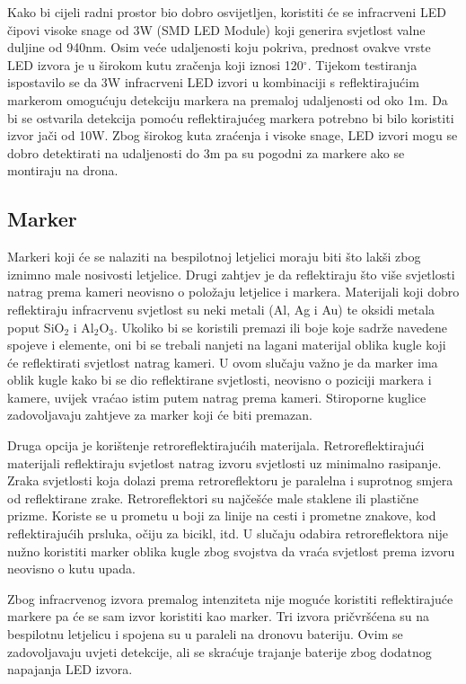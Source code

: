 \documentclass[times, utf8, diplomski]{fer}
\begin{document}
Kako bi cijeli radni prostor bio dobro osvijetljen, koristiti će se infracrveni LED čipovi visoke snage od 3W (SMD LED Module) koji generira svjetlost valne duljine od 940nm. Osim veće udaljenosti koju pokriva, prednost ovakve vrste LED izvora je u širokom kutu zračenja koji iznosi 120$^{\circ}$. Tijekom testiranja ispostavilo se da 3W infracrveni LED izvori u kombinaciji s reflektirajućim markerom omogućuju detekciju markera na premaloj udaljenosti od oko 1m. Da bi se ostvarila detekcija pomoću reflektirajućeg markera potrebno bi bilo koristiti izvor jači od 10W. Zbog širokog kuta zraćenja i visoke snage, LED izvori mogu se dobro detektirati na udaljenosti do 3m pa su pogodni za markere ako se montiraju na drona.

\subsection{Marker}
Markeri koji će se nalaziti na bespilotnoj letjelici moraju biti što lakši zbog iznimno male nosivosti letjelice. Drugi zahtjev je da reflektiraju što više svjetlosti natrag prema kameri neovisno o položaju letjelice i markera. Materijali koji dobro reflektiraju infracrvenu svjetlost su neki metali (Al, Ag i Au) te oksidi metala poput SiO$_2$ i Al$_2$O$_3$. Ukoliko bi se koristili premazi ili boje koje sadrže navedene spojeve i elemente, oni bi se trebali nanjeti na lagani materijal oblika kugle koji će reflektirati svjetlost natrag kameri. U ovom slučaju važno je da marker ima oblik kugle kako bi se dio reflektirane svjetlosti, neovisno o poziciji markera i kamere, uvijek vraćao istim putem natrag prema kameri. Stiroporne kuglice zadovoljavaju zahtjeve za marker koji će biti premazan.

Druga opcija je korištenje retroreflektirajućih materijala. Retroreflektirajući materijali reflektiraju svjetlost natrag izvoru svjetlosti uz minimalno rasipanje. Zraka svjetlosti koja dolazi prema retroreflektoru je paralelna i suprotnog smjera od reflektirane zrake. Retroreflektori su najčešće male staklene ili plastične prizme. Koriste se u prometu u boji za linije na cesti i prometne znakove, kod reflektirajućih prsluka,  očiju za bicikl, itd. U slučaju odabira retroreflektora nije nužno koristiti marker oblika kugle zbog svojstva da vraća svjetlost prema izvoru neovisno o kutu upada.

Zbog infracrvenog izvora premalog intenziteta nije moguće koristiti reflektirajuće markere pa će se sam izvor koristiti kao marker. Tri izvora pričvršćena su na bespilotnu letjelicu i spojena su u paraleli na dronovu bateriju. Ovim se zadovoljavaju uvjeti detekcije, ali se skraćuje trajanje baterije zbog dodatnog napajanja LED izvora. 
\end{document}
